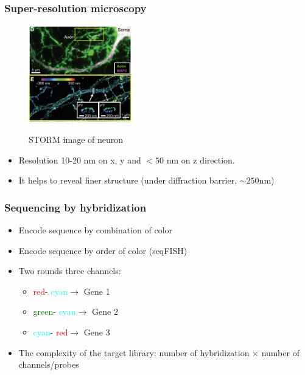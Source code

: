 \documentclass{beamer}
\newcommand{\red}{\textcolor{red}{red}}
\newcommand{\green}{\textcolor{green}{green}}
\newcommand{\cyan}{\textcolor{cyan}{cyan}}
\begin{document}
  \begin{frame}
  \frametitle{Super-resolution microscopy}
  \begin{figure}
    \centering
    \includegraphics[width=0.4\textwidth]{storm}
    \caption{STORM image of neuron} \cite{xu2013actin}
  \end{figure}
  \begin{itemize}
    \item Resolution 10-20 nm on x, y and $<50$ nm on z direction.
    \item It helps to reveal finer structure (under diffraction barrier, $\sim 250$nm)
  \end{itemize}
  \end{frame}

  \begin{frame}
  \frametitle{Sequencing by hybridization}

  \begin{itemize}
    \item Encode sequence by combination of color \cite{lubeck2012single}
    \item Encode sequence by order of color \cite{lubeck2014single} (seqFISH)
    \item Two rounds three channels:
      \begin{itemize}
        \item \red - \cyan $\rightarrow$ Gene 1
        \item \green - \cyan $\rightarrow$ Gene 2
        \item \cyan - \red $\rightarrow$ Gene 3
      \end{itemize}
    \item The complexity of the target library: number of hybridization $\times$ number of channels/probes
  \end{itemize}
  \end{frame}
\end{document}
